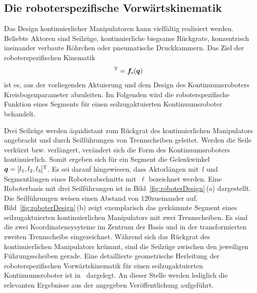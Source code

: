 \subsection{Die roboterspezifische Vorwärtskinematik}
\label{subsec:spezifischeVorwaertskinematik}

Das Design kontinuierlicher Manipulatoren kann vielfältig realisiert werden. Beliebte Aktoren sind Seilzüge, kontinuierliche biegsame Rückgrate, konzentrisch ineinander verbaute Röhrchen oder pneumatische Druckkammern. Das Ziel der roboterspezifischen Kinematik
\begin{align}
[\kappa, \phi, \ell]^\transpose = \bm{f}_{\mathrm{s}}(\bm{q})
\label{eq:fspezifisch}
\end{align}
ist es, aus der vorliegenden Aktuierung und dem Design des Kontinuumsroboters Kreisbogenparameter abzuleiten. Im Folgenden wird die roboterspezifische Funktion eines Segments für einen seilzugaktuierten Kontinuumsroboter behandelt. \newline

Drei Seilzüge werden äquidistant zum Rückgrat des kontinuierlichen Manipulators angebracht und durch Seilführungen von Trennscheiben geleitet. Werden die Seile verkürzt bzw. verlängert, verändert sich die Form des Kontinuumsroboters kontinuierlich. Somit ergeben sich für ein Segment die Gelenkwinkel~$\bm{q} = [l_1, l_2, l_3]^{\mathrm{T}}$. Es sei darauf hingewiesen, dass Aktorlängen mit~$l$ und Segmentlängen eines Roboterabschnitts mit~$\ell$ bezeichnet werden. Eine Roboterbasis mit drei Seilführungen ist in Bild~\ref{fig:roboterDesign}\,(a) dargestellt. Die Seilführungen weisen einen Abstand von $120$\degree zueinander auf. 
Bild~\ref{fig:roboterDesign}\,(b) zeigt exemplarisch das gerkümmte Segment eines seilzugaktuierten kontinuierlichen Manipulators mit zwei Trennscheiben. Es sind die zwei Koordinatensysyteme im Zentrum der Basis und in der transformierten zweiten Trennscheibe eingezeichnet. Während sich das Rückgrat des kontinuierlichen Manipulators krümmt, sind die Seilzüge zwischen den jeweiligen Führungsscheiben gerade.
Eine detaillierte geometrische Herleitung der roboterspezifischen Vorwärtskinematik für einen seilzugaktuierten Kontinuumsroboter ist in~\cite{JW06} dargelegt. An dieser Stelle werden lediglich die relevanten Ergebnisse aus der angegeben Veröffentlichung aufgeführt. 

